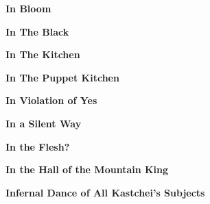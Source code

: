 \vspace{10pt} 
\begin{center}\textbf{In Bloom}\end{center}
\newline
\vspace{10pt} 
\begin{center}\textbf{In The Black}\end{center}
\newline
\vspace{10pt} 
\begin{center}\textbf{In The Kitchen}\end{center}
\newline
\vspace{10pt} 
\begin{center}\textbf{In The Puppet Kitchen}\end{center}
\newline
\vspace{10pt} 
\begin{center}\textbf{In Violation of Yes}\end{center}
\newline
\vspace{10pt} 
\begin{center}\textbf{In a Silent Way}\end{center}
\newline
\vspace{10pt} 
\begin{center}\textbf{In the Flesh?}\end{center}
\newline
\vspace{10pt} 
\begin{center}\textbf{In the Hall of the Mountain King}\end{center}
\newline
\vspace{10pt} 
\begin{center}\textbf{Infernal Dance of All Kastchei's Subjects}\end{center}
\newline
\vspace{10pt} 
